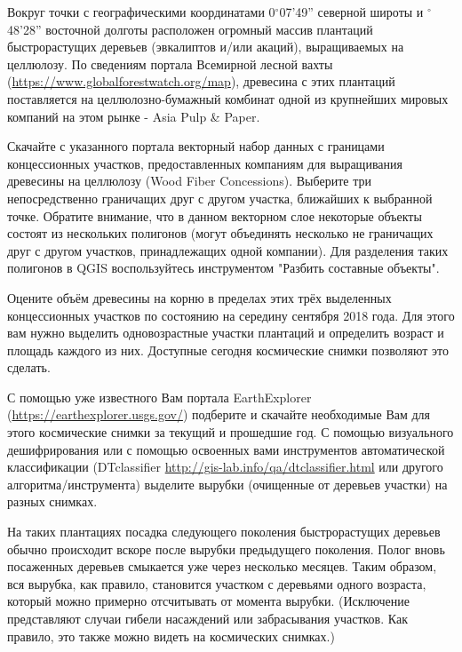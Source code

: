 
Вокруг точки с географическими координатами 0$^{\circ}$07'49'' северной широты и $^{\circ}$48'28'' 
восточной долготы расположен огромный массив плантаций быстрорастущих деревьев (эвкалиптов и/или акаций), 
выращиваемых на целлюлозу. По сведениям портала Всемирной лесной вахты (\url{https://www.globalforestwatch.org/map}), древесина с этих плантаций поставляется на целлюлозно-бумажный комбинат одной из крупнейших мировых компаний на этом рынке -  
Asia Pulp \& Paper.

Скачайте с указанного портала векторный набор данных с границами концессионных участков, предоставленных компаниям для выращивания древесины на целлюлозу (Wood Fiber Concessions). Выберите три непосредственно граничащих друг с другом участка, ближайших к выбранной точке. Обратите внимание, что в данном векторном слое некоторые объекты состоят из нескольких полигонов (могут объединять несколько не граничащих друг с другом участков, принадлежащих одной компании). Для разделения таких полигонов в QGIS воспользуйтесь инструментом "Разбить составные объекты".

Оцените объём древесины на корню в пределах этих трёх выделенных концессионных участков по состоянию на середину сентября 2018 года. Для этого вам нужно выделить одновозрастные участки плантаций и определить возраст и площадь каждого из них. Доступные сегодня космические снимки позволяют это сделать.

С помощью уже известного Вам портала EarthExplorer (\url{https://earthexplorer.usgs.gov/}) подберите и 
скачайте необходимые Вам для этого космические снимки за текущий и прошедшие год. 
С помощью визуального дешифрирования или с помощью освоенных вами инструментов 
автоматической классификации (DTclassifier \url{http://gis-lab.info/qa/dtclassifier.html} или другого алгоритма/инструмента) выделите вырубки (очищенные от деревьев участки) на разных снимках.

На таких плантациях посадка следующего поколения быстрорастущих деревьев обычно происходит вскоре после вырубки предыдущего поколения. Полог вновь посаженных деревьев смыкается уже через несколько месяцев. Таким образом, вся вырубка, как правило, становится участком с деревьями одного возраста, который можно примерно отсчитывать от момента вырубки. (Исключение представляют случаи гибели насаждений или забрасывания участков. Как правило, это также можно видеть на космических снимках.)

